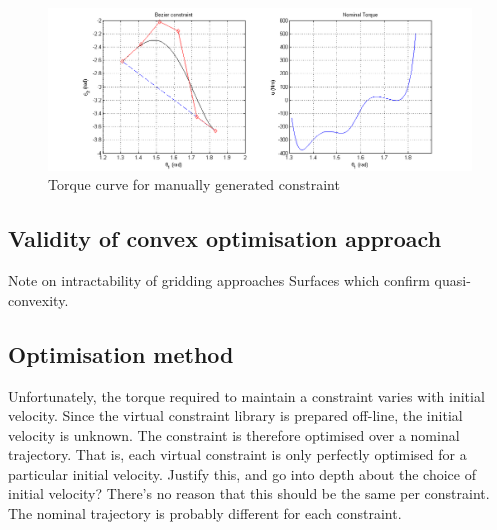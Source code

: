\begin{figure}
	\centering
	\includegraphics[width=0.9\linewidth]{4VirtConstLib/manualgen.png}
	\caption{Torque curve for manually generated constraint}
	\label{fig:manualgen}
\end{figure}

\subsection{Validity of convex optimisation approach}
{\color{blue} Note on intractability of gridding approaches}
Surfaces which confirm quasi-convexity.

\subsection{Optimisation method}
Unfortunately, the torque required to maintain a constraint varies with initial velocity. Since the virtual constraint library is prepared off-line, the initial velocity is unknown. The constraint is therefore optimised over a nominal trajectory. That is, each virtual constraint is only perfectly optimised for a particular initial velocity. {\color{red} Justify this, and go into depth about the choice of initial velocity? There's no reason that this should be the same per constraint. The nominal trajectory is probably different for each constraint.}

